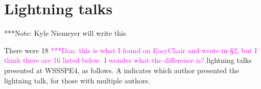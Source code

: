 \documentclass[11pt, oneside]{amsart}
\newcommand{\note}[1]{ {\textcolor{blueish}    { ***Note:      #1 }}}
\newcommand{\katznote}[1]{ {\textcolor{magenta}    { ***Dan:      #1 }}}
\begin{document}
\section{Lightning talks} \label{sec:lightning}
\begin{comment}
\note{
\href{http://wssspe.researchcomputing.org.uk/wssspe4/agenda/}{Slides.}}
\end{comment}

\note{Kyle Niemeyer will write this}

There were 18 \katznote{this is what I found on EasyChair and wrote in \S2, but I think there are 16 listed below.  I wonder what the difference is?} lightning talks presented at WSSSPE4, as follows.
%
A \textsuperscript{\textasteriskcentered} indicates which author presented the
lightning talk, for those with multiple authors.
%
\end{document}
